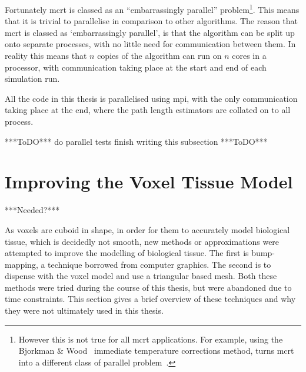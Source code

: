 Fortunately \gls{mcrt} is classed as an ``embarrassingly parallel'' problem\footnote{However this is not true for all \gls{mcrt} applications. For example, using the Bjorkman $\&$ Wood~\cite{bjorkman2001radiative} immediate temperature corrections method, turns \gls{mcrt} into a different class of parallel problem~\cite{robitaille2011hyperion}.}. This means that it is trivial to parallelise in comparison to other algorithms. The reason that \gls{mcrt} is classed as `embarrassingly parallel', is that the algorithm can be split up onto separate processes, with no little need for communication between them. In reality this means that $n$ copies of the algorithm can run on $n$ cores in a processor, with communication taking place at the start and end of each simulation run. 

All the code in this thesis is parallelised using \gls{mpi}, with the only communication taking place at the end, where the path length estimators are collated on to all process. 

***ToDO***
do parallel tests
finish writing this subsection
***ToDO***

\section{Improving the Voxel Tissue Model}\label{sec:improve}

***Needed?***

As voxels are cuboid in shape, in order for them to accurately model biological tissue, which is decidedly not smooth, new methods or approximations were attempted to improve the modelling of biological tissue. 
The first is bump-mapping, a technique borrowed from computer graphics. The second is to dispense with the voxel model and use a triangular based mesh. Both these methods were tried during the course of this thesis, but were abandoned due to time constraints. This section gives a brief overview of these techniques and why they were not ultimately used in this thesis.
